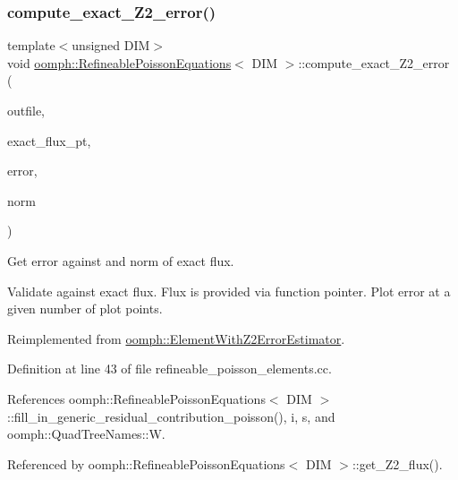 \subsubsection{\texorpdfstring{compute\+\_\+exact\+\_\+\+Z2\+\_\+error()}{compute\_exact\_Z2\_error()}}
{\footnotesize\ttfamily template$<$unsigned D\+IM$>$ \\
void \hyperlink{classoomph_1_1RefineablePoissonEquations}{oomph\+::\+Refineable\+Poisson\+Equations}$<$ D\+IM $>$\+::compute\+\_\+exact\+\_\+\+Z2\+\_\+error (\begin{DoxyParamCaption}\item[{std\+::ostream \&}]{outfile,  }\item[{\hyperlink{classoomph_1_1FiniteElement_a690fd33af26cc3e84f39bba6d5a85202}{Finite\+Element\+::\+Steady\+Exact\+Solution\+Fct\+Pt}}]{exact\+\_\+flux\+\_\+pt,  }\item[{double \&}]{error,  }\item[{double \&}]{norm }\end{DoxyParamCaption})\hspace{0.3cm}{\ttfamily [virtual]}}



Get error against and norm of exact flux. 

Validate against exact flux. Flux is provided via function pointer. Plot error at a given number of plot points. 

Reimplemented from \hyperlink{classoomph_1_1ElementWithZ2ErrorEstimator_a8632b99123982c3dd8b26a5eeea6dc20}{oomph\+::\+Element\+With\+Z2\+Error\+Estimator}.



Definition at line 43 of file refineable\+\_\+poisson\+\_\+elements.\+cc.



References oomph\+::\+Refineable\+Poisson\+Equations$<$ D\+I\+M $>$\+::fill\+\_\+in\+\_\+generic\+\_\+residual\+\_\+contribution\+\_\+poisson(), i, s, and oomph\+::\+Quad\+Tree\+Names\+::W.



Referenced by oomph\+::\+Refineable\+Poisson\+Equations$<$ D\+I\+M $>$\+::get\+\_\+\+Z2\+\_\+flux().

\mbox{\label{classoomph_1_1RefineablePoissonEquations_a1cea3422561cd3016aa4cc04c0e5be56}} 
